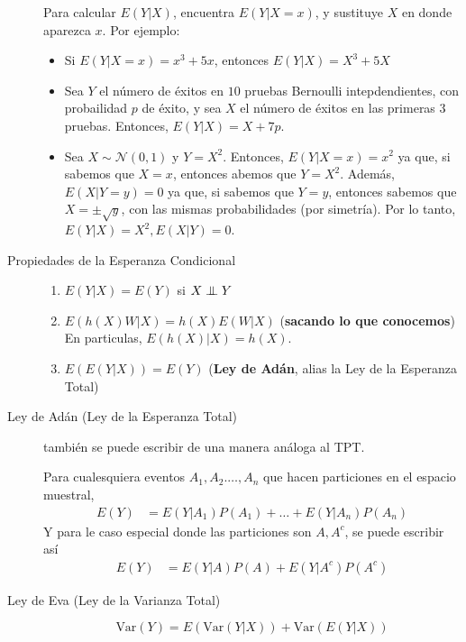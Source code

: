 \documentclass[12,landscape]{article}
\newcommand\independent{\protect\mathpalette{\protect\independenT}{\perp}}
\def\independenT#1#2{\mathrel{\setbox0\hbox{$#1#2$}%
    \copy0\kern-\wd0\mkern4mu\box0}}
\newcommand{\var}{\textrm{Var}}
\newcommand{\N}{\mathcal{N}}
\begin{document}
\begin{multicols*}{3}
\begin{description}
    Para calcular $E(Y|X)$, encuentra $E(Y|X=x)$, y sustituye $X$ en donde aparezca $x$. Por ejemplo:
    \begin{itemize}
        \item Si $E(Y|X=x) = x^3 + 5x$, entonces $E(Y|X) = X^3 + 5X$
        \item Sea $Y$ el número de éxitos en $10$ pruebas Bernoulli intepdendientes, con probailidad $p$ de éxito, y sea $X$ el número de éxitos en las primeras $3$ pruebas. Entonces, $E(Y|X) = X + 7p$.
        \item Sea $X \sim \N(0,1)$ y $Y = X^2$. Entonces, $E(Y|X=x) = x^2$ ya que, si sabemos que $X=x$, entonces abemos que $Y=X^2$. Además, $E(X|Y=y) = 0$ ya que, si sabemos que $Y=y$, entonces sabemos que $X = \pm \sqrt{y}$, con las mismas probabilidades (por simetría). Por lo tanto, $E(Y|X) = X^2, E(X|Y)=0$.
    \end{itemize} 
    
        \item[Propiedades de la Esperanza Condicional] \quad
    \begin{enumerate}
        \item $E(Y|X) = E(Y)$ si $X \independent Y$
        \item $E(h(X)W|X) = h(X)E(W|X)$ (\textbf{sacando lo que conocemos}) \\
        En particulas, $E(h(X)|X) = h(X)$.
        \item $E(E(Y|X)) = E(Y)$ (\textbf{Ley de Adán}, alias la Ley de la Esperanza Total)
    \end{enumerate}

    \item[Ley de Adán (Ley de la Esperanza Total)] también se puede escribir de una manera análoga al TPT.

    Para cualesquiera eventos $A_1, A_2. \dots, A_n$ que hacen particiones en el espacio muestral,
        \begin{align*}
        E(Y) &= E(Y|A_1)P(A_1) + \dots + E(Y|A_n)P(A_n)
    \end{align*}
    Y para le caso especial donde las particiones son $A, A^c$, se puede escribir así
        \begin{align*}
            E(Y) &= E(Y|A)P(A) + E(Y|A^c)P(A^c)
    \end{align*}

    \item[Ley de Eva (Ley de la Varianza Total)] \quad
    \[\var(Y) = E(\var(Y|X)) + \var(E(Y|X))\]
\end{description}



\end{multicols*}
\end{document}
